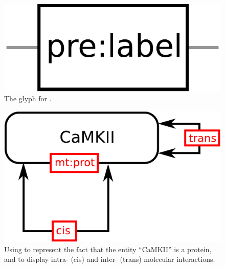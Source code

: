 \begin{figure}[H]
  \centering
  \includegraphics[scale = 0.3]{images/unitInformation}
  \caption{The \ER glyph for .}
  \label{fig:unitInformation}
\end{figure}


\begin{figure}[H]
  \centering
  \includegraphics[scale = 0.5]{examples/ex-unitInformation}
  \caption{Using  to represent the fact that the entity ``CaMKII'' is a protein, and to display intra- (cis) and inter- (trans) molecular interactions.}
  \label{fig:ex-unitInformation}
\end{figure}

